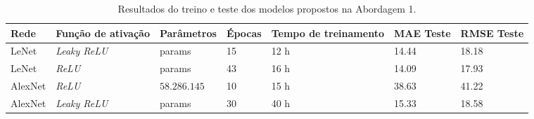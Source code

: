 	\begin{table}[!ht]
		\caption{Resultados do treino e teste dos modelos propostos na Abordagem 1.}
		\label{tab:results-2}
		\begin{adjustbox}{width=1\textwidth}
			\begin{tabular}{l l l l l l l}
				\toprule
				Rede & Função de ativação & Parâmetros & Épocas & Tempo de treinamento & MAE Teste & RMSE Teste \\
				\midrule
				LeNet & \emph{Leaky ReLU} & params & 15 & 12 h & 14.44 & 18.18 \\
				LeNet & \emph{ReLU} & params & 43 & 16 h & 14.09 & 17.93 \\
				AlexNet & \emph{ReLU} & $58.286.145$ & 10 & 15 h & 38.63 & 41.22 \\
				AlexNet & \emph{Leaky ReLU} & params & 30 & 40 h & 15.33 & 18.58 \\
				\bottomrule
			\end{tabular}
		\end{adjustbox}
	\end{table}



